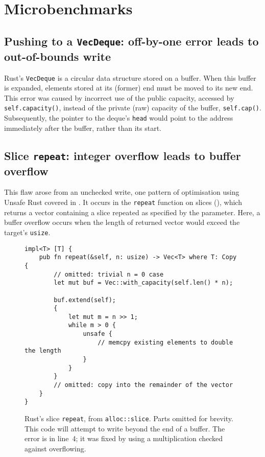 \documentclass[dissertation.tex]{subfiles}
\begin{document}
\section{Microbenchmarks}
\label{sec:eval-micro}




\subsection{Pushing to a \texttt{VecDeque}: off-by-one error leads to out-of-bounds write}
\label{sec:eval-micro-push}

Rust's \texttt{VecDeque} is a circular data structure stored on a
buffer.
When this buffer is expanded, elements stored at its (former) end must
be moved to its new end.
This error was caused by incorrect use of the public capacity, accessed
by \texttt{self.capacity()}, instead of the private (raw) capacity of
the buffer, \texttt{self.cap()}.
Subsequently, the pointer to the deque's \texttt{head} would point to
the address immediately after the buffer, rather than its start.



\subsection{Slice \texttt{repeat}: integer overflow leads to buffer overflow}
\label{sec:eval-micro-repeat}

This flaw arose from an unchecked write, one pattern of optimisation
using Unsafe Rust covered in .
It occurs in the \texttt{repeat} function on slices
(), which returns a vector containing a slice
repeated as specified by the parameter.
Here, a buffer overflow occurs when the length of returned vector would
exceed the target's \texttt{usize}.

\begin{figure}[ht]
\begin{lstlisting}
impl<T> [T] {
    pub fn repeat(&self, n: usize) -> Vec<T> where T: Copy {
        // omitted: trivial n = 0 case
        let mut buf = Vec::with_capacity(self.len() * n);

        buf.extend(self);
        {
            let mut m = n >> 1;
            while m > 0 {
                unsafe {
                    // memcpy existing elements to double the length
                }
            }
        }
        // omitted: copy into the remainder of the vector
    }
}
\end{lstlisting}
\caption{ Rust's slice \texttt{repeat}, from
\texttt{alloc::slice}. Parts omitted for brevity. This code will attempt
to write beyond the end of a buffer.
The error is in line~4; it was fixed by using a multiplication checked
against overflowing.}
\label{lst:slice-repeat}
\end{figure}
\end{document}
